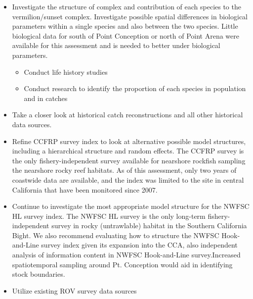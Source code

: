 \documentclass[11pt,
  english,
  a4paper,
]{article}
\begin{document}
\begin{itemize}
\item
  Investigate the structure of complex and contribution of each species to the vermilion/sunset complex. Investigate possible spatial differences in biological parameters within a single species and also between the two species. Little biological data for south of Point Conception or north of Point Arena were available for this assessment and is needed to better under biological parameters.


  \begin{itemize}
  \item


    Conduct life history studies

    \tagmcend\tagstructend\tagstructend

    \tagmcend\tagstructend\tagstructend
  \item


    Conduct research to identify the proportion of each species in population and in catches

    \tagmcend\tagstructend\tagstructend

    \tagmcend\tagstructend\tagstructend
  \end{itemize}

  \tagstructend
\item
  Take a closer look at historical catch reconstructions and all other historical data sources.
\item
  Refine CCFRP survey index to look at alternative possible model structures, including a hierarchical structure and random effects. The CCFRP survey is the only fishery-independent survey available for nearshore rockfish sampling the nearshore rocky reef habitats. As of this assessment, only two years of coastwide data are available, and the index was limited to the site in central California that have been monitored since 2007.
\item
  Continue to investigate the most appropriate model structure for the NWFSC HL survey index. The NWFSC HL survey is the only long-term fishery-independent survey in rocky (untrawlable) habitat in the Southern California Bight. We also recommend evaluating how to structure the NWFSC Hook-and-Line survey index given its expansion into the CCA, also independent analysis of information content in NWFSC Hook-and-Line survey.Increased spatiotemporal sampling around Pt. Conception would aid in identifying stock boundaries.
\item
  Utilize existing ROV survey data sources


\end{itemize}
\end{document}
